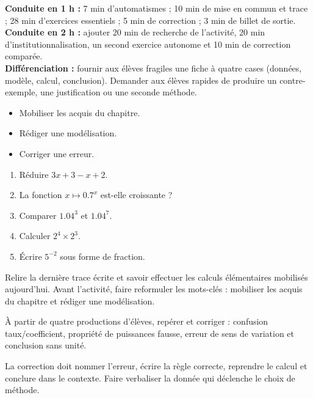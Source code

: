 \ifmxteacher
\begin{method}
\textbf{Conduite en 1 h :} 7 min d'automatismes ; 10 min de mise en commun et trace ; 28 min d'exercices essentiels ; 5 min de correction ; 3 min de billet de sortie.\\
\textbf{Conduite en 2 h :} ajouter 20 min de recherche de l'activité, 20 min d'institutionnalisation, un second exercice autonome et 10 min de correction comparée.\\
\textbf{Différenciation :} fournir aux élèves fragiles une fiche à quatre cases (données, modèle, calcul, conclusion). Demander aux élèves rapides de produire un contre-exemple, une justification ou une seconde méthode.
\end{method}
\fi
{}
\begin{objectives}\begin{itemize}\item Mobiliser les acquis du chapitre.\item Rédiger une modélisation.\item Corriger une erreur.\end{itemize}\end{objectives}
\begin{fluency}\begin{enumerate}\item Réduire $3x+3-x+2$. \item La fonction $x\mapsto\num{0,7}^x$ est-elle croissante ? \item Comparer $\num{1,04}^3$ et $\num{1,04}^7$. \item Calculer $2^4\times2^3$. \item Écrire $5^{-2}$ sous forme de fraction. \end{enumerate}\end{fluency}
\begin{prerequisites}Relire la dernière trace écrite et savoir effectuer les calculs élémentaires mobilisés aujourd'hui. Avant l'activité, faire reformuler les mots-clés : mobiliser les acquis du chapitre et rédiger une modélisation.\end{prerequisites}

\begin{activity}
À partir de quatre productions d'élèves, repérer et corriger : confusion taux/coefficient, propriété de puissances fausse, erreur de sens de variation et conclusion sans unité.

\end{activity}
\begin{solution}La correction doit nommer l'erreur, écrire la règle correcte, reprendre le calcul et conclure dans le contexte. Faire verbaliser la donnée qui déclenche le choix de méthode.\end{solution}

